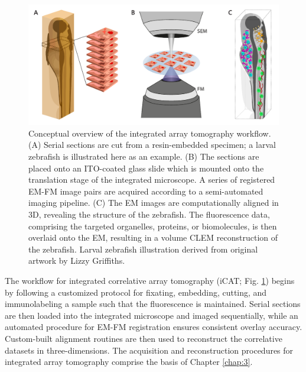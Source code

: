 \begin{figure}[!tbh]
    \centering
    \includegraphics[width=\linewidth]{chapter-1/figures/fig1_iCAT_v2.pdf}
    \caption{Conceptual overview of the integrated array tomography workflow.
    (A) Serial sections are cut from a resin-embedded specimen; a larval zebrafish is illustrated here as an example.%
    (B) The sections are placed onto an ITO-coated glass slide which is mounted onto the translation stage of the integrated microscope. A series of registered EM-FM image pairs are acquired according to a semi-automated imaging pipeline.
    (C) The EM images are computationally aligned in 3D, revealing the structure of the zebrafish. The fluorescence data, comprising the targeted organelles, proteins, or biomolecules, is then overlaid onto the EM, resulting in a volume CLEM reconstruction of the zebrafish.
    Larval zebrafish illustration derived from original artwork by Lizzy Griffiths.}
    \label{fig:1.1_icat}
\end{figure}

The workflow for integrated correlative array tomography (iCAT; Fig. \ref{fig:1.1_icat}) begins by following a customized protocol for fixating, embedding, cutting, and immunolabeling a sample such that the fluorescence is maintained. Serial sections are then loaded into the integrated microscope and imaged sequentially, while an automated procedure for EM-FM registration \cite{haring2017automated} ensures consistent overlay accuracy. Custom-built alignment routines are then used to reconstruct the correlative datasets in three-dimensions. The acquisition and reconstruction procedures for integrated array tomography comprise the basis of Chapter \ref{chap:3}.

